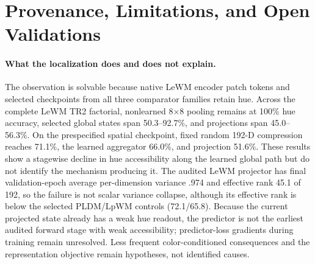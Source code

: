 \documentclass{article}
\begin{document}
\section{Provenance, Limitations, and Open Validations}

\paragraph{What the localization does and does not explain.}
The observation is solvable because native LeWM encoder patch tokens and selected
checkpoints from all three comparator families retain hue.  Across the complete LeWM TR2 factorial,
nonlearned 8$\times$8 pooling remains at 100\% hue accuracy, selected global
states span 50.3--92.7\%, and projections span 45.0--56.3\%.  On the
prespecified spatial checkpoint, fixed random 192-D compression reaches 71.1\%,
the learned aggregator 66.0\%, and projection 51.6\%.  These results show a
stagewise decline in hue accessibility along the learned global path but do
not identify the mechanism producing it.  The audited LeWM projector has final
validation-epoch average per-dimension variance .974 and effective rank 45.1 of 192, so the
failure is not scalar variance collapse, although its effective rank is below
the selected PLDM/LpWM controls (72.1/65.8).  Because the current projected
state already has a weak hue readout, the predictor is not the earliest audited
forward stage with weak accessibility; predictor-loss gradients during
training remain unresolved.  Less frequent color-conditioned consequences and the
representation objective remain hypotheses, not identified causes.
\end{document}
